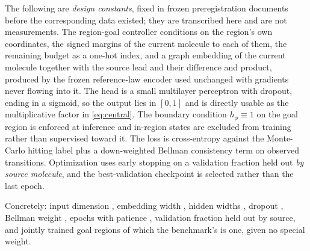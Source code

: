 The following are \emph{design constants}, fixed in frozen preregistration documents before the corresponding data existed; they are transcribed here and are not measurements.
The region-goal controller conditions on the region's own coordinates, the signed margins of the current molecule to each of them, the remaining budget as a one-hot index, and a graph embedding of the current molecule together with the source lead and their difference and product, produced by the frozen reference-law encoder used unchanged with gradients never flowing into it.
The head is a small multilayer perceptron with dropout, ending in a sigmoid, so the output lies in $[0,1]$ and is directly usable as the multiplicative factor in \eqref{eq:central}.
The boundary condition $h_\phi\equiv1$ on the goal region is enforced at inference and in-region states are excluded from training rather than supervised toward it.
The loss is cross-entropy against the Monte-Carlo hitting label plus a down-weighted Bellman consistency term on observed transitions.
Optimization uses early stopping on a validation fraction held out \emph{by source molecule}, and the best-validation checkpoint is selected rather than the last epoch.

Concretely: input dimension \XXX{}, embedding width \XXX{}, hidden widths \XXX{}, dropout \XXX{}, Bellman weight \XXX{}, epochs \XXX{} with patience \XXX{}, validation fraction \XXX{} held out by source, and \XXX{} jointly trained goal regions of which the benchmark's is one, given no special weight.

